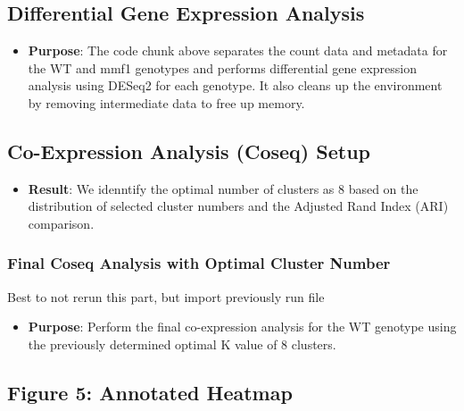 \documentclass[
  11pt,
]{article}
\providecommand{\tightlist}{%
  \setlength{\itemsep}{0pt}\setlength{\parskip}{0pt}}\usepackage{longtable,booktabs,array}
\begin{document}
\subsection{Differential Gene Expression
Analysis}\label{differential-gene-expression-analysis}

\begin{itemize}
\tightlist
\item
  \textbf{Purpose}: The code chunk above separates the count data and
  metadata for the WT and mmf1 genotypes and performs differential gene
  expression analysis using DESeq2 for each genotype. It also cleans up
  the environment by removing intermediate data to free up memory.
\end{itemize}

\subsection{Co-Expression Analysis (Coseq)
Setup}\label{co-expression-analysis-coseq-setup}

\begin{itemize}
\tightlist
\item
  \textbf{Result}: We idenntify the optimal number of clusters as 8
  based on the distribution of selected cluster numbers and the Adjusted
  Rand Index (ARI) comparison.
\end{itemize}

\subsubsection{\texorpdfstring{\textbf{Final Coseq Analysis with Optimal
Cluster
Number}}{Final Coseq Analysis with Optimal Cluster Number}}\label{final-coseq-analysis-with-optimal-cluster-number}

Best to not rerun this part, but import previously run file

\begin{itemize}
\tightlist
\item
  \textbf{Purpose}: Perform the final co-expression analysis for the WT
  genotype using the previously determined optimal K value of 8
  clusters.
\end{itemize}

\subsection{Figure 5: Annotated
Heatmap}\label{figure-5-annotated-heatmap}
\end{document}
